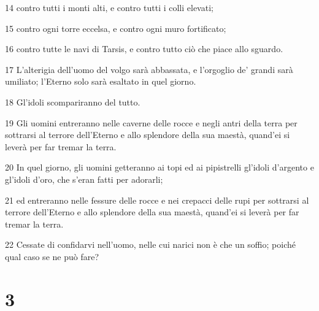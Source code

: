 \par 14 contro tutti i monti alti, e contro tutti i colli elevati;
\par 15 contro ogni torre eccelsa, e contro ogni muro fortificato;
\par 16 contro tutte le navi di Tarsis, e contro tutto ciò che piace allo sguardo.
\par 17 L'alterigia dell'uomo del volgo sarà abbassata, e l'orgoglio de' grandi sarà umiliato; l'Eterno solo sarà esaltato in quel giorno.
\par 18 Gl'idoli scompariranno del tutto.
\par 19 Gli uomini entreranno nelle caverne delle rocce e negli antri della terra per sottrarsi al terrore dell'Eterno e allo splendore della sua maestà, quand'ei si leverà per far tremar la terra.
\par 20 In quel giorno, gli uomini getteranno ai topi ed ai pipistrelli gl'idoli d'argento e gl'idoli d'oro, che s'eran fatti per adorarli;
\par 21 ed entreranno nelle fessure delle rocce e nei crepacci delle rupi per sottrarsi al terrore dell'Eterno e allo splendore della sua maestà, quand'ei si leverà per far tremar la terra.
\par 22 Cessate di confidarvi nell'uomo, nelle cui narici non è che un soffio; poiché qual caso se ne può fare?

\chapter{3}


